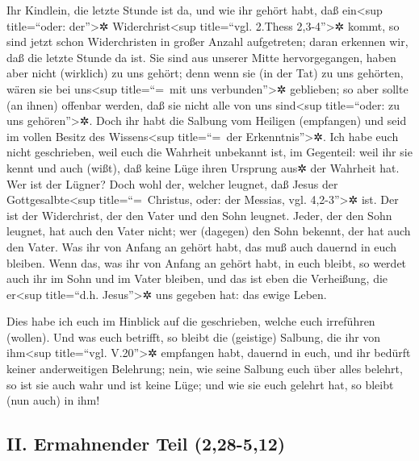  Ihr Kindlein, die letzte Stunde ist da, und wie ihr
gehört habt, daß ein\textless sup title=``oder: der''\textgreater✲
Widerchrist\textless sup title=``vgl. 2.Thess 2,3-4''\textgreater✲
kommt, so sind jetzt schon Widerchristen in großer Anzahl aufgetreten;
daran erkennen wir, daß die letzte Stunde da ist.  Sie
sind aus unserer Mitte hervorgegangen, haben aber nicht (wirklich) zu
uns gehört; denn wenn sie (in der Tat) zu uns gehörten, wären sie bei
uns\textless sup title=``=~mit uns verbunden''\textgreater✲ geblieben;
so aber sollte (an ihnen) offenbar werden, daß sie nicht alle von uns
sind\textless sup title=``oder: zu uns gehören''\textgreater✲.
 Doch ihr habt die Salbung vom Heiligen (empfangen) und
seid im vollen Besitz des Wissens\textless sup title=``=~der
Erkenntnis''\textgreater✲.  Ich habe euch nicht
geschrieben, weil euch die Wahrheit unbekannt ist, im Gegenteil: weil
ihr sie kennt und auch (wißt), daß keine Lüge ihren Ursprung aus✲ der
Wahrheit hat.  Wer ist der Lügner? Doch wohl der, welcher
leugnet, daß Jesus der Gottgesalbte\textless sup title=``=~Christus,
oder: der Messias, vgl. 4,2-3''\textgreater✲ ist. Der ist der
Widerchrist, der den Vater und den Sohn leugnet.  Jeder,
der den Sohn leugnet, hat auch den Vater nicht; wer (dagegen) den Sohn
bekennt, der hat auch den Vater.  Was ihr von Anfang an
gehört habt, das muß auch dauernd in euch bleiben. Wenn das, was ihr von
Anfang an gehört habt, in euch bleibt, so werdet auch ihr im Sohn und im
Vater bleiben,  und das ist eben die Verheißung, die
er\textless sup title=``d.h. Jesus''\textgreater✲ uns gegeben hat: das
ewige Leben.

 Dies habe ich euch im Hinblick auf die geschrieben,
welche euch irreführen (wollen).  Und was euch betrifft,
so bleibt die (geistige) Salbung, die ihr von ihm\textless sup
title=``vgl. V.20''\textgreater✲ empfangen habt, dauernd in euch, und
ihr bedürft keiner anderweitigen Belehrung; nein, wie seine Salbung euch
über alles belehrt, so ist sie auch wahr und ist keine Lüge; und wie sie
euch gelehrt hat, so bleibt (nun auch) in ihm!

\hypertarget{ii.-ermahnender-teil-228-512}{%
\subsection{II. Ermahnender Teil
(2,28-5,12)}\label{ii.-ermahnender-teil-228-512}}

